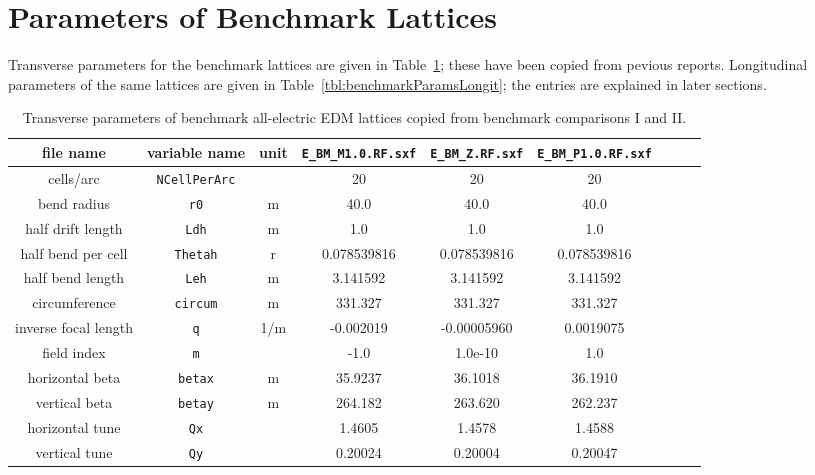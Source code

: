 \documentclass[]{article}
\begin{document}
\section{Parameters of Benchmark Lattices}
Transverse parameters for the benchmark lattices are given in 
Table~\ref{tbl:benchmarkParamsTransv}; these have been copied from
pevious reports. Longitudinal parameters of the same
lattices are given in Table~\ref{tbl:benchmarkParamsLongit}; the
entries are explained in later sections.
%
\begin{table}[h]
\caption{\label{tbl:benchmarkParamsTransv}Transverse parameters of benchmark all-electric 
EDM lattices copied from benchmark comparisons I and II.} 
\medskip
\centering
\begin{tabular}{|c|c|c|c|c|c|c|c|c|}           \hline
file name         & variable name     & unit & {\tt E\_BM\_M1.0.RF.sxf} & {\tt E\_BM\_Z.RF.sxf} & {\tt E\_BM\_P1.0.RF.sxf} \\ 
\hline
cells/arc         & {\tt NCellPerArc} &      &      20               &       20           &        20             \\
bend radius       &  {\tt r0}         &  m   &     40.0              &      40.0          &       40.0            \\
half drift length &  {\tt Ldh}        &  m   &      1.0              &     1.0            &        1.0            \\
half bend per cell & {\tt Thetah}     &  r   &   0.078539816         &  0.078539816       &  0.078539816          \\
half bend length  & {\tt Leh}         &  m   &    3.141592           &  3.141592          &   3.141592            \\
circumference     & {\tt circum}      &  m   &   331.327             &   331.327          &    331.327            \\ 
\hline
inverse focal length &  {\tt q}       & 1/m  &    -0.002019          & -0.00005960        &     0.0019075         \\
field index       &  {\tt m}          &      &     -1.0              &  1.0e-10           &         1.0            \\ 
\hline
horizontal beta  & {\tt betax}        &  m   &    35.9237            &  36.1018           &     36.1910            \\
vertical beta     & {\tt betay}       &  m   &   264.182             &  263.620           &     262.237            \\ 
\hline
horizontal tune  &  {\tt Qx}          &      &     1.4605            &   1.4578           &      1.4588            \\
vertical tune     &  {\tt Qy}         &      &     0.20024           &   0.20004          &     0.20047            \\ 
\hline
\end{tabular}
\end{table}
\end{document}
